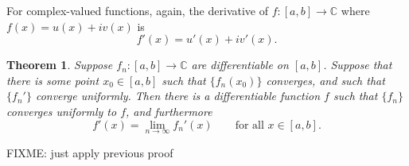\documentclass[12pt]{book}
\newcommand{\C}{{\mathbb{C}}}
\theoremstyle{plain}
\newtheorem{thm}{Theorem}[section]
\theoremstyle{remark}
\theoremstyle{definition}
\theoremstyle{exercise}
\theoremstyle{example}
\begin{document}
For complex-valued functions, again, the derivative of $f \colon [a,b] \to
\C$ where $f(x) = u(x)+iv(x)$ is
\begin{equation*}
f'(x) = u'(x)+iv'(x) .
\end{equation*}

\begin{thm}
Suppose $f_n \colon [a,b] \to \C$ are differentiable on $[a,b]$.
Suppose that there is some point $x_0 \in [a,b]$ such that $\{ f_n(x_0) \}$
converges, and such that $\{ f_n' \}$ converge uniformly.
Then there is a differentiable function $f$ such that
$\{ f_n \}$ converges uniformly to $f$, and furthermore
\begin{equation*}
f'(x) = \lim_{n\to\infty} f_n'(x) \qquad \text{for all $x \in [a,b]$.}
\end{equation*}
\end{thm}

FIXME: just apply previous proof
\end{document}
